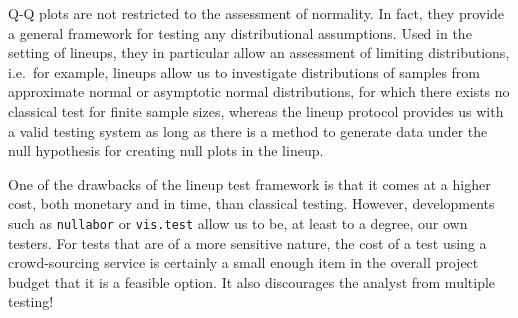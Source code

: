 \documentclass[12pt]{article}\usepackage[]{graphicx}\usepackage[]{color}
\begin{document}

Q-Q plots are not restricted to the assessment of normality. In fact, they provide a general framework for testing any distributional assumptions. Used in the setting of lineups, they in particular allow an assessment of limiting distributions, i.e.~for example, lineups allow us to investigate distributions of
 samples from approximate normal or asymptotic normal distributions, for which  there exists  no classical test for finite sample sizes, whereas the lineup protocol provides us with a valid testing system
  as long as there is a method  to generate data under the null hypothesis for creating null plots in the lineup.
 

One of the drawbacks of the lineup test framework is that it comes at a higher cost, both monetary and in time, than classical testing.
However, developments such as {\tt nullabor} \citep{nullabor} or {\tt vis.test} \citep{vistest} allow us to be, at least to a degree, our own testers. For tests that are of a more sensitive nature, the cost of a test using a crowd-sourcing service is certainly a small enough item in the overall project budget that it is a feasible 
option. It also discourages the analyst from multiple testing!
\end{document}
